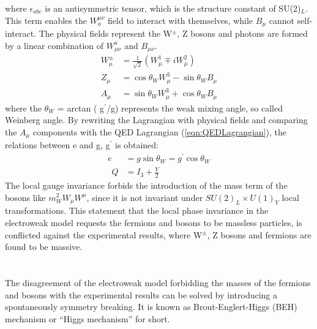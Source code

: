 where $\epsilon_{a b c}$ is an antisymmetric tensor, which is the structure constant of SU(2)$_L$. This term enables the $W_{a}^{\mu \nu}$ field to interact with themselves, while $B_{\mu}$ cannot self-interact.
The physical fields represent the W$^{\pm}$, Z bosons and photons are formed by a linear combination of $W_{\mu \nu}^{a}$ and $B_{\mu \nu}$.
\begin{equation}
\begin{aligned}
W_{\mu}^{\pm} &=\frac{1}{\sqrt{2}}\left(W_{\mu}^{1} \mp i W_{\mu}^{2}\right) \\
Z_{\mu} &=\cos \theta_{W} W_{\mu}^{3}-\sin \theta_{W} B_{\mu} \\
A_{\mu} &=\sin \theta_{W} W_{\mu}^{3}+\cos \theta_{W} B_{\mu}
\end{aligned}
\end{equation}
where the $\theta_{W}$ = arctan ( g$^{\prime}$/g) represents the weak mixing angle, so called Weinberg angle. By rewriting the Lagrangian with physical fields and comparing the $A_{\mu}$ components with the QED Lagrangian (\ref{eqn:QEDLagrangian}), the relations between e and g, g$^{\prime}$ is obtained:
\begin{equation}
\begin{aligned}
e&=g \sin \theta_{W}=g^{\prime} \cos \theta_{W} \\
\ \ Q&=I_{3}+\frac{Y}{2}
\end{aligned}
\end{equation}
The local gauge invariance forbids the introduction of the mass term of the bosons like $m^2_W W_\mu W^\mu$, since it is not invariant under $SU(2)_L \times U(1)_Y$ local transformations.
This statement that the local phase invariance in the electroweak model requests the fermions and bosons to be massless particles, is conflicted against the experimental results, where W$^{\pm}$, Z bosons and fermions are found to be massive.
\\ \\
\noindent\textbf{} \\ 
The disagreement of the electroweak model forbidding the masses of the fermions and bosons with the experimental results can be solved by introducing a spontaneously symmetry breaking.
It is known as Brout-Englert-Higgs (BEH) mechanism or “Higgs mechanism” for short.

